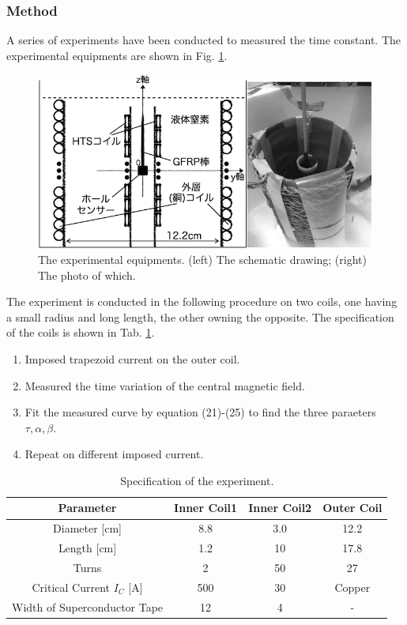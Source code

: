\subsubsection{Method}
A series of experiments have been conducted to measured the time constant.
The experimental equipments are shown in Fig. \ref{fig:experimentalEquipments}.
\begin{figure}[H]
  \includegraphics[width=18.5cm, bb=9 9 900 550]{./section3Effectiveness/experimentalEquipments.png}
  \caption{The experimental equipments. (left) The schematic drawing; (right) The photo of which.}
  \label{fig:experimentalEquipments}
\end{figure}
The experiment is conducted in the following procedure on two coils,
one having a small radius and long length, the other owning the opposite.
The specification of the coils is shown in Tab. \ref{tab:expSpecification}.
\begin{enumerate}
  \item Imposed trapezoid current on the outer coil.
  \item Measured the time variation of the central magnetic field.
  \item Fit the measured curve by equation (21)-(25) to find the three paraeters $\tau, \alpha, \beta$.
  \item Repeat on different imposed current.
\end{enumerate}
\begin{table}[H]
  \centering
  \caption{Specification of the experiment.}
  \label{tab:expSpecification}
  \begin{tabular}{cccc}\hline\hline
    Parameter & Inner Coil1 & Inner Coil2 & Outer Coil \\\hline
    Diameter [cm] & 8.8 & 3.0 & 12.2\\\hline
    Length [cm] & 1.2 & 10 & 17.8 \\\hline
    Turns & 2 & 50 & 27 \\\hline
    Critical Current $I_C$ [A] & 500 & 30 & Copper \\\hline
    Width of Superconductor Tape & 12 & 4 & -
  \end{tabular}
\end{table}

